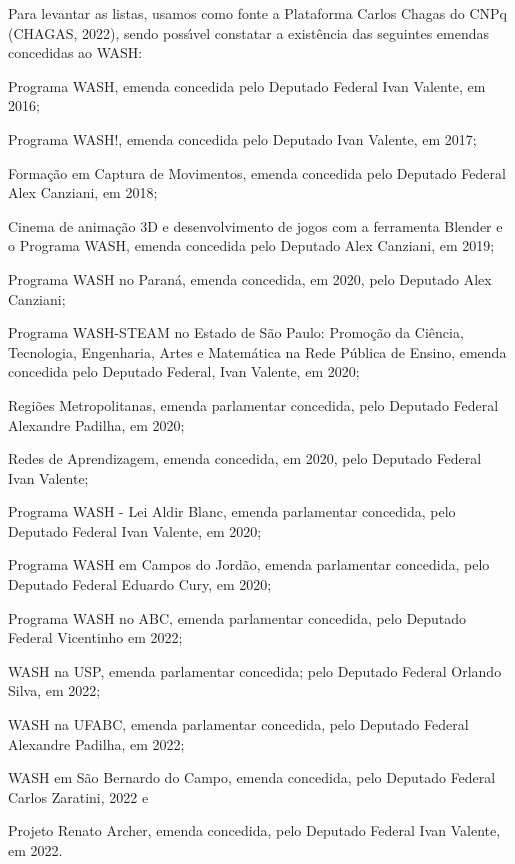 \documentclass[
12pt,		%
openright,	%
twoside,  %
a4paper,			%
chapter=TITLE,		%
english,			%
french,				%
spanish,			%
brazil				%
]{USPSC-classe/USPSC}
\begin{document}
Para levantar as listas, usamos como fonte a Plataforma Carlos Chagas do CNPq (CHAGAS, 2022), sendo poss\'{\i}vel constatar a exist\^encia das seguintes emendas concedidas ao WASH:


















\begin{alineas}
\item \textquotedbl Programa WASH\textquotedbl , emenda concedida pelo Deputado Federal Ivan Valente, em 2016;
\item \textquotedbl Programa WASH!\textquotedbl , emenda concedida pelo Deputado Ivan Valente, em 2017;
\item \textquotedbl Forma\c{c}\~ao em Captura de Movimentos\textquotedbl , emenda concedida pelo Deputado Federal Alex Canziani, em 2018;
\item \textquotedbl Cinema de anima\c{c}\~ao 3D e desenvolvimento de jogos com a ferramenta Blender e o Programa WASH\textquotedbl , emenda concedida pelo Deputado Alex Canziani, em 2019;
\item \textquotedbl Programa WASH no Paran\'a\textquotedbl , emenda concedida, em 2020, pelo Deputado Alex Canziani;
\item \textquotedbl Programa WASH-STEAM no Estado de S\~ao Paulo: Promo\c{c}\~ao da Ci\^encia, Tecnologia, Engenharia, Artes  e Matem\'atica na Rede P\'ublica de Ensino\textquotedbl , emenda concedida pelo Deputado Federal, Ivan Valente, em 2020;
\item \textquotedbl Regi\~oes Metropolitanas\textquotedbl , emenda parlamentar concedida, pelo Deputado Federal Alexandre Padilha, em 2020;
\item \textquotedbl Redes de Aprendizagem\textquotedbl , emenda concedida, em 2020, pelo Deputado Federal Ivan Valente;
\item \textquotedbl Programa WASH - Lei Aldir Blanc\textquotedbl , emenda parlamentar concedida, pelo Deputado Federal  Ivan Valente, em 2020;
\item \textquotedbl Programa WASH em Campos do Jord\~ao\textquotedbl , emenda parlamentar concedida, pelo Deputado Federal Eduardo Cury, em 2020;
\item \textquotedbl Programa WASH no ABC\textquotedbl , emenda parlamentar concedida, pelo Deputado Federal Vicentinho em 2022;
\item \textquotedbl WASH na USP\textquotedbl , emenda parlamentar concedida; pelo Deputado Federal Orlando Silva, em 2022;
\item \textquotedbl WASH na UFABC\textquotedbl , emenda parlamentar concedida, pelo Deputado Federal Alexandre Padilha, em 2022;
\item \textquotedbl WASH em S\~ao Bernardo do Campo\textquotedbl , emenda concedida, pelo Deputado Federal Carlos Zaratini, 2022 e
\item \textquotedbl Projeto Renato Archer\textquotedbl , emenda concedida, pelo Deputado Federal Ivan Valente, em 2022.
\end{alineas}
\end{document}
